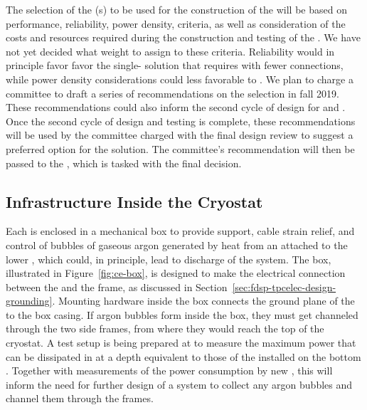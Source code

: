 The selection of the (s) to be used for the
construction of the   will be
based on performance, reliability, power density, 
criteria, as well as consideration of the costs and
resources required during the construction and testing
of the . We have not yet decided what weight 
to assign to these criteria. Reliability would in principle favor
favor the single- solution that requires 
 with fewer connections, while power 
density considerations could less favorable to .
We plan to charge a committee to draft a series of recommendations 
on the  selection in fall
2019. These recommendations could also inform the second cycle of design for
 and . Once the second cycle of design
and testing is complete, these recommendations will be used by the
committee charged with the final design review to suggest a
preferred option for the  solution.
The committee's recommendation 
will then be passed to the  , 
which is tasked with the final  decision.

\subsection{Infrastructure Inside the Cryostat}
\label{sec:fdsp-tpcelec-design-infrastructure}

Each  is enclosed in a mechanical  box 
to provide support, cable strain relief, and control of bubbles of gaseous
argon generated by heat from an  attached to the lower ,
which could, in principle, lead to discharge of the  system. The
 box, illustrated in Figure~\ref{fig:ce-box}, is designed to make the 
electrical connection between the  and the  
frame, as discussed %
in Section~\ref{sec:fdsp-tpcelec-design-grounding}.
Mounting hardware inside the  box connects the ground plane 
of the  to the box casing. If argon bubbles %
form inside
the  box, they must get %
channeled through the two side
 frames, from where they would reach the top of the cryostat.
A test setup is being prepared at  to measure the
maximum power that can be dissipated in  at a
depth equivalent to those of the  installed on
the bottom . Together with measurements of the
power consumption by new , this will inform
the need for further design of a system to collect any
argon bubbles and channel them through the  frames.

